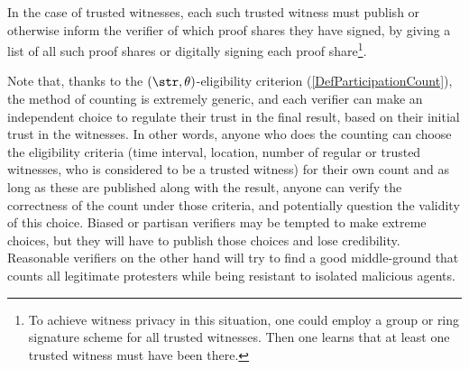 

In the case of trusted witnesses, each such trusted witness must
publish or otherwise inform the 
verifier of which proof shares they have signed, \eg by giving a list 
of all such proof shares or digitally signing each proof share\footnote{
 To achieve witness privacy in this situation, one could employ a group or 
 ring signature scheme for all trusted witnesses.
 Then one learns that at least one trusted witness must have been there.
}.

Note that, thanks to the \((\str,\theta)\)-eligibility criterion (\cref{DefParticipationCount}), the method of counting is extremely generic, and each verifier can make an independent choice to regulate their trust in the final result, based on their initial trust in the witnesses. In other words, anyone who does the counting can choose the eligibility
criteria (time interval, location, number of regular or trusted
witnesses, who is considered to be a trusted witness) for their own count
and as long as these are published along with the result, anyone can
verify the correctness of the count under those criteria, and potentially question the validity of this choice. Biased or partisan verifiers may be tempted to make extreme choices, but they will have to publish those choices and lose credibility. Reasonable verifiers on the other hand will try to find a good middle-ground that counts all legitimate protesters while being resistant to isolated malicious agents.

